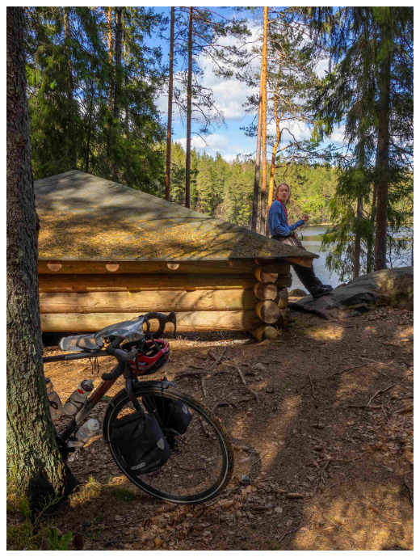 \begin{Figure}
\begin{center}
\begin{multicols}{2}
\begin{center}
			\noindent\includegraphics[width=1.05\linewidth]{assets/pyörävaellus11}

\end{center}
\end{multicols}
\end{center}
\end{Figure}
